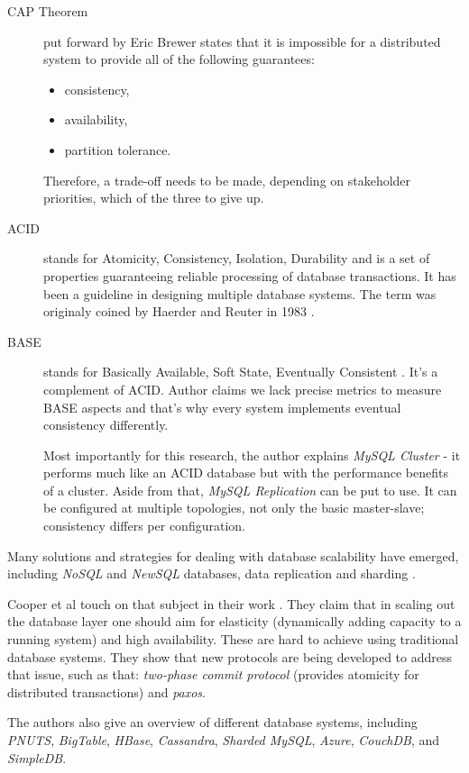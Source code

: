 \documentclass{uvamscse}
\begin{document}
\begin{description}
  \item[CAP Theorem]
  put forward by Eric Brewer \cite{Cap} states that it is impossible for a distributed system to provide all of the following guarantees:
  \begin{itemize}
    \item consistency,
    \item availability,
    \item partition tolerance.
  \end{itemize}
  Therefore, a trade-off needs to be made, depending on stakeholder priorities, which of the three to give up.
  \item[ACID]
   stands for Atomicity, Consistency, Isolation, Durability and is a set of properties guaranteeing reliable processing of database transactions. It has been a guideline in designing multiple database systems. The term was originaly coined by Haerder and Reuter in 1983 \cite{ACID}.
  \item[BASE]
   stands for Basically Available, Soft State, Eventually Consistent \cite{EveCon}. It’s a complement of ACID. Author claims we lack precise metrics to measure BASE aspects and that’s why every system implements eventual consistency differently.

  Most importantly for this research, the author \cite{EveCon} explains \textit{MySQL Cluster} - it performs much like an ACID database but with the performance benefits of a cluster. Aside from that, \textit{MySQL Replication} can be put to use. It can be configured at multiple topologies, not only the basic master-slave; consistency differs per configuration.
\end{description}

Many solutions and strategies for dealing with database scalability have emerged, including \textit{NoSQL} and \textit{NewSQL} databases, data replication and sharding \cite{Amza}.

Cooper et al touch on that subject in their work \cite{Ycsb}. They claim that in scaling out the database layer one should aim for elasticity (dynamically adding capacity to a running system) and high availability. These are hard to achieve using traditional database systems. They show that new protocols are being developed to address that issue, such as that: \textit{two-phase commit protocol} (provides atomicity for distributed transactions) and \textit{paxos}.


The authors \cite{Ycsb} also give an overview of different database systems, including \textit{PNUTS}, \textit{BigTable}, \textit{HBase}, \textit{Cassandra}, \textit{Sharded MySQL}, \textit{Azure}, \textit{CouchDB}, and \textit{SimpleDB}.
\end{document}
